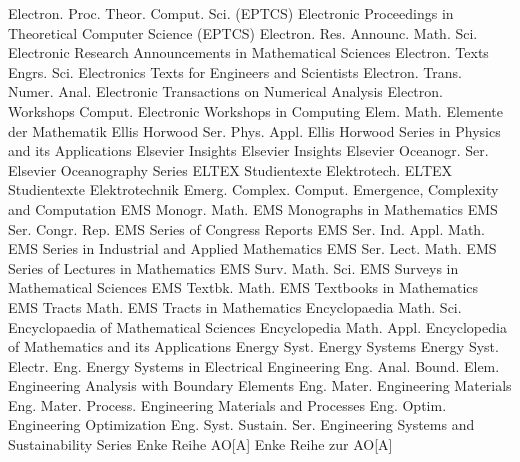 {Electron. Proc. Theor. Comput. Sci. (EPTCS)}
{Electronic Proceedings in Theoretical Computer Science (EPTCS)}
{Electron. Res. Announc. Math. Sci.}
{Electronic Research Announcements in Mathematical Sciences}
{Electron. Texts Engrs. Sci.}
{Electronics Texts for Engineers and Scientists}
{Electron. Trans. Numer. Anal.}
{Electronic Transactions on Numerical Analysis}
{Electron. Workshops Comput.}
{Electronic Workshops in Computing}
{Elem. Math.}
{Elemente der Mathematik}
{Ellis Horwood Ser. Phys. Appl.}
{Ellis Horwood Series in Physics and its Applications}
{Elsevier Insights}
{Elsevier Insights}
{Elsevier Oceanogr. Ser.}
{Elsevier Oceanography Series}
{ELTEX Studientexte Elektrotech.}
{ELTEX Studientexte Elektrotechnik}
{Emerg. Complex. Comput.}
{Emergence, Complexity and Computation}
{EMS Monogr. Math.}
{EMS Monographs in Mathematics}
{EMS Ser. Congr. Rep.}
{EMS Series of Congress Reports}
{EMS Ser. Ind. Appl. Math.}
{EMS Series in Industrial and Applied Mathematics}
{EMS Ser. Lect. Math.}
{EMS Series of Lectures in Mathematics}
{EMS Surv. Math. Sci.}
{EMS Surveys in Mathematical Sciences}
{EMS Textbk. Math.}
{EMS Textbooks in Mathematics}
{EMS Tracts Math.}
{EMS Tracts in Mathematics}
{Encyclopaedia Math. Sci.}
{Encyclopaedia of Mathematical Sciences}
{Encyclopedia Math. Appl.}
{Encyclopedia of Mathematics and its Applications}
{Energy Syst.}
{Energy Systems}
{Energy Syst. Electr. Eng.}
{Energy Systems in Electrical Engineering}
{Eng. Anal. Bound. Elem.}
{Engineering Analysis with Boundary Elements}
{Eng. Mater.}
{Engineering Materials}
{Eng. Mater. Process.}
{Engineering Materials and Processes}
{Eng. Optim.}
{Engineering Optimization}
{Eng. Syst. Sustain. Ser.}
{Engineering Systems and Sustainability Series}
{Enke Reihe AO[A]}
{Enke Reihe zur AO[A]}
